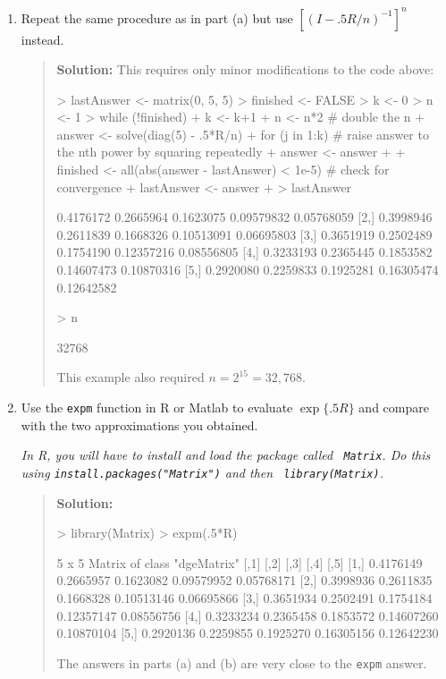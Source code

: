 \documentclass{article}
\begin{document}
\begin{enumerate}
\begin{enumerate}
    \item Repeat the same procedure as in part (a) but use $[(I-.5R/n)^{-1}]^n$
    instead.
    \begin{quotation}{\bf Solution:}
    This requires only minor modifications to the code above:
\begin{Schunk}
\begin{Sinput}
> lastAnswer <- matrix(0, 5, 5)
> finished <- FALSE
> k <- 0
> n <- 1
> while (!finished) {
+   k <- k+1
+   n <- n*2 # double the n
+   answer <- solve(diag(5) - .5*R/n) 
+   for (j in 1:k) { # raise answer to the nth power by squaring repeatedly
+     answer <- answer %*% answer
+   }
+   finished <- all(abs(answer - lastAnswer) < 1e-5) # check for convergence
+   lastAnswer <- answer
+ }
> lastAnswer
\end{Sinput}
\begin{Soutput}
          [,1]      [,2]      [,3]       [,4]       [,5]
[1,] 0.4176172 0.2665964 0.1623075 0.09579832 0.05768059
[2,] 0.3998946 0.2611839 0.1668326 0.10513091 0.06695803
[3,] 0.3651919 0.2502489 0.1754190 0.12357216 0.08556805
[4,] 0.3233193 0.2365445 0.1853582 0.14607473 0.10870316
[5,] 0.2920080 0.2259833 0.1925281 0.16305474 0.12642582
\end{Soutput}
\begin{Sinput}
> n
\end{Sinput}
\begin{Soutput}
[1] 32768
\end{Soutput}
\end{Schunk}
    This example also required $n=2^{15}=32{,}768$.
    \end{quotation}
    

    \item Use the {\tt expm} function in R or Matlab to evaluate $\exp \{.5R\}$
    and compare with the two approximations you obtained.
    
    {\em In R, you will have to install and load the package called {\tt
    Matrix}. Do this using {\tt install.packages("Matrix")} and then {\tt
    library(Matrix)}.} 
    \begin{quotation}{\bf Solution:}
\begin{Schunk}
\begin{Sinput}
> library(Matrix)
> expm(.5*R)
\end{Sinput}
\begin{Soutput}
5 x 5 Matrix of class "dgeMatrix"
          [,1]      [,2]      [,3]       [,4]       [,5]
[1,] 0.4176149 0.2665957 0.1623082 0.09579952 0.05768171
[2,] 0.3998936 0.2611835 0.1668328 0.10513146 0.06695866
[3,] 0.3651934 0.2502491 0.1754184 0.12357147 0.08556756
[4,] 0.3233234 0.2365458 0.1853572 0.14607260 0.10870104
[5,] 0.2920136 0.2259855 0.1925270 0.16305156 0.12642230
\end{Soutput}
\end{Schunk}
    The answers in parts (a) and (b) are very close to the {\tt expm} answer.
    \end{quotation}
        

\end{enumerate}
\end{enumerate}
\end{document}
